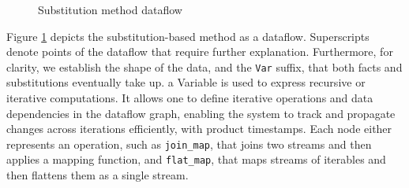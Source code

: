 \documentclass[sigconf,screen,review=false,natbib]{acmart}
\theoremstyle{definition}
\begin{document}
\begin{figure} [htb!]
	\caption{Substitution method dataflow}
	\label{fig:substitution_simple_ddflow}
\end{figure}
Figure \ref{fig:substitution_simple_ddflow} depicts the substitution-based method as a dataflow. Superscripts denote
points of the dataflow that require further explanation. Furthermore, for clarity, we establish the shape of the
data, and the \verb|Var| suffix, that both facts and substitutions eventually take up. a Variable is used to express
recursive or iterative computations. It allows one to define iterative operations and data dependencies in the dataflow
graph, enabling the system to track and propagate changes across iterations efficiently, with product timestamps. Each
node either represents an operation, such as \verb|join_map|, that joins two streams and then applies a mapping function,
and \verb|flat_map|, that maps streams of iterables and then flattens them as a single stream.
\end{document}
